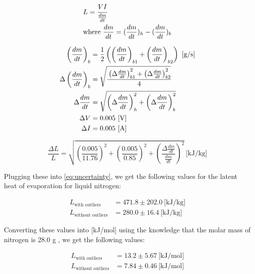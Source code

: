 \documentclass{article}
\begin{document}
\begin{align*}
\begin{split}
  &L = \cfrac{VI}{\frac{dm}{dt}}
  \\
  &\text{where}~ \frac{dm}{dt} = (\frac{dm}{dt})_h - (\frac{dm}{dt})_b
\end{split}
\end{align*}

\begin{align*}
  \left( \frac{dm}{dt} \right)_b &= \frac{1}{2} \left(
    \left( \frac{dm}{dt} \right)_{b1}
    + \left( \frac{dm}{dt} \right)_{b2}
    \right) ~\text{[g/s]}
  \\
  \Delta \left( \frac{dm}{dt} \right)_b &=
    \sqrt{\cfrac{
      \left( \Delta \frac{dm}{dt} \right)^2_{b1} + \left( \Delta \frac{dm}{dt} \right)^2_{b2}
    }{4}}
  \\
  \Delta \frac{dm}{dt} &= \sqrt{ \left( \Delta \frac{dm}{dt} \right)^2_h + \left( \Delta \frac{dm}{dt} \right)^2_b }
  \\
  \Delta V &= 0.005 ~\text{[V]}
  \\
  \Delta I &= 0.005 ~\text{[A]}
\end{align*}

\begin{equation}\label{eq:uncertainty}
  \frac{\Delta L}{L} = \sqrt{ \left( \frac{0.005}{11.76} \right)^2 + \left( \frac{0.005}{0.85} \right)^2 + \left( \frac{\Delta \frac{dm}{dt}}{\frac{dm}{dt}} \right)^2 } ~\text{[kJ/kg]}
\end{equation}

Plugging these into \eqref{eq:uncertainty}, we get the following values for the latent heat of evaporation for liquid nitrogen:

\begin{align*}
  L_{\text{with outliers}}    &= 471.8 \pm 202.0 ~ \text{[kJ/kg]} \\
  L_{\text{without outliers}} &= 280.0 \pm 16.4 ~ \text{[kJ/kg]}
\end{align*}

Converting these values into [kJ/mol] using the knowledge that the molar mass of nitrogen is 28.0 g \autocite{UPCSE2018}, we get the following values:

\begin{align*}
  L_{\text{with outliers}}    &= 13.2 \pm 5.67 ~ \text{[kJ/mol]} \\
  L_{\text{without outliers}} &= 7.84 \pm 0.46 ~ \text{[kJ/mol]}
\end{align*}
\end{document}
